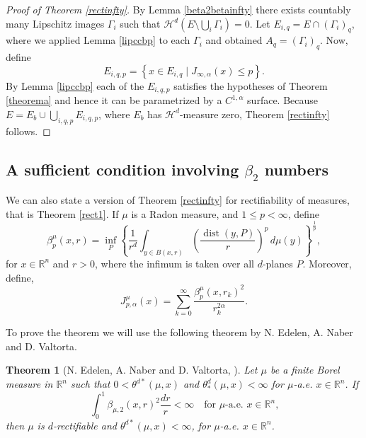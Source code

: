 \documentclass[11pt, twoside, leqno]{article}
\numberwithin{equation}{section}
\theoremstyle{plain}
\newtheorem{thm}{Theorem}[section]
\theoremstyle{definition}
\newcommand{\R}{\mathbb{R}}
\newcommand{\dist}{\operatorname{dist}}
\begin{document}
\begin{proof}[Proof of Theorem \ref{rectinfty}]
By Lemma \ref{beta2betainfty} there exists countably many Lipschitz images $\Gamma_i$ such that $\mathcal{H}^d(E \setminus \bigcup_i \Gamma_i)=0$. 
Let $E_{i,q}=E\cap (\Gamma_i)_q$, where we applied Lemma \ref{lipccbp} to each $\Gamma_i$ and obtained $A_q=(\Gamma_i)_q$. Now, define 
\begin{equation}
    E_{i,q,p}=\left\{ x \in E_{i,q} \mid J_{\infty,\alpha}(x) \leq p \right\}.
\end{equation}
By Lemma \ref{lipccbp} each of the $E_{i,q,p}$ satisfies the hypotheses of Theorem \ref{theorema} and hence it can be parametrized by a $C^{1,\alpha}$ surface.
Because $E=E_b \cup \bigcup_{i,q,p} E_{i,q,p}$, where $E_b$ has $\mathcal{H}^d$-measure zero, Theorem \ref{rectinfty} follows.
\end{proof}


\subsection{A sufficient condition involving \texorpdfstring{$\beta_{2}$}{B1} numbers}

We can also state a version of Theorem \ref{rectinfty} for rectifiability of measures, that is Theorem \ref{rect1}. 
If $\mu$ is a Radon measure, and $1\leq p < \infty$, define
\begin{equation}
\beta_p^{\mu}(x,r)=\inf_P\left\{\frac{1}{r^d} \int_{y \in B(x,r)} \left(\frac{\dist(y,P)}{r}\right)^p\,d\mu(y)\right\}^{\frac{1}{p}},
\end{equation}
for $x \in \R^n$ and $r>0$, where the infimum is taken over all $d$-planes $P$.
Moreover, define,
\begin{equation}
J^{\mu}_{p, \alpha}(x)= \sum_{k=0}^{\infty}\frac{\beta^{\mu}_p(x,r_k)^2}{r_k^{2\alpha}}.
\end{equation}

To prove the theorem we will use the following theorem by N. Edelen, A. Naber and D. Valtorta.

\begin{thm}[N. Edelen, A. Naber and D. Valtorta, \cite{naber}] \label{t:ENV}
Let $\mu$ be a finite Borel measure in $\R^n$ such that $0< \theta^{d *}(\mu,x)$ and $\theta_*^d({\mu},x) <\infty$ for $\mu$-a.e. $x \in \R^n$. If 
\begin{equation}
\int_0^1\beta_{\mu,2}(x,r)^2 \frac{dr}{r} < \infty \quad \text{for $\mu$-a.e. $x \in \R^n$,}
\end{equation}
then $\mu$ is $d$-rectifiable and $\theta^{d *}(\mu,x)< \infty$, for $\mu$-a.e. $x \in \R^n$.
\end{thm}
\end{document}
